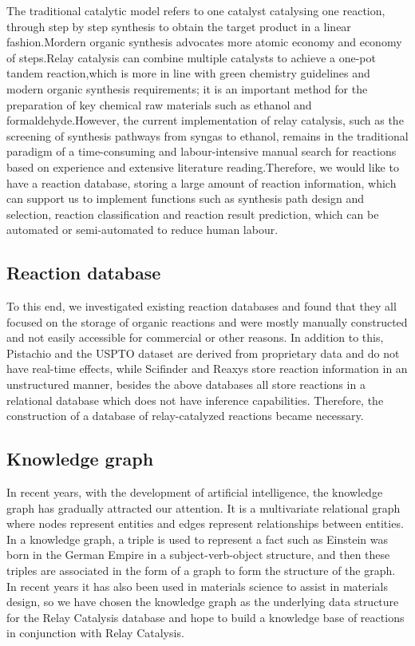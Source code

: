 \documentclass[%
 aip,
 jmp,%
 amsmath,amssymb,
 reprint,%
]{revtex4-2}
\begin{document}
The traditional catalytic model refers to one catalyst catalysing one reaction, through step by step synthesis to obtain the target product
 in a linear fashion.Mordern organic synthesis advocates more atomic economy and economy of steps.Relay catalysis can combine multiple 
 catalysts to achieve a one-pot tandem reaction,which is more in line with green chemistry guidelines and modern organic synthesis 
 requirements; it is an important method for the preparation of key chemical raw materials such as ethanol and formaldehyde.However, the 
 current implementation of relay catalysis, such as the screening of synthesis pathways from syngas to ethanol, remains in the traditional 
 paradigm of a time-consuming and labour-intensive manual search for reactions based on experience and extensive literature reading.Therefore, 
 we would like to have a reaction database, storing a large amount of reaction information, which can support us to implement functions 
 such as synthesis path design and selection, reaction classification and reaction result prediction, which can be automated or 
 semi-automated to reduce human labour.

\subsection{Reaction database}
To this end, we investigated existing reaction databases and found that they all focused on the storage of organic reactions and were mostly manually constructed and not easily accessible for commercial or other reasons.
In addition to this, Pistachio and the USPTO dataset are derived from proprietary data and do not have real-time effects, while Scifinder and Reaxys store reaction information in an unstructured manner, besides the above databases all store reactions in a relational database which does not have inference capabilities.
Therefore, the construction of a database of relay-catalyzed reactions became necessary.

\subsection{Knowledge graph}

In recent years, with the development of artificial intelligence, the knowledge graph has gradually attracted our attention.
It is a multivariate relational graph where nodes represent entities and edges represent relationships between entities. In a knowledge graph, a triple is used to represent a fact such as Einstein was born in the German Empire in a subject-verb-object structure, and then these triples are associated in the form of a graph to form the structure of the graph. In recent years it has also been used in materials science to assist in materials design, so we have chosen the knowledge graph as the underlying data structure for the Relay Catalysis database and hope to build a knowledge base of reactions in conjunction with Relay Catalysis.
\end{document}
